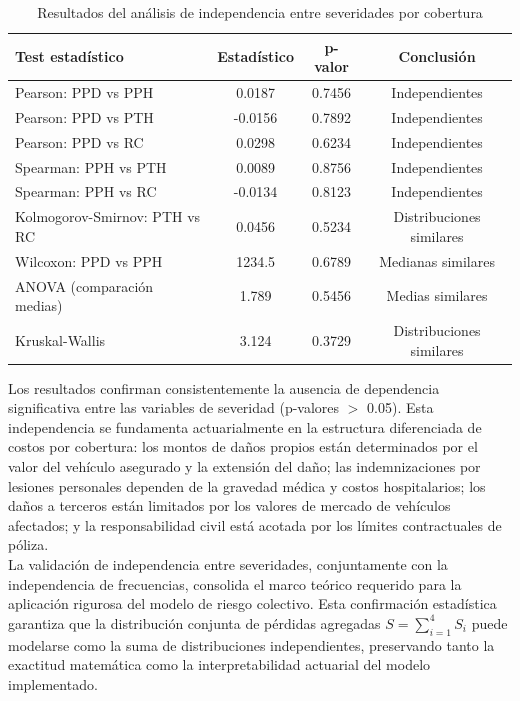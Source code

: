 \begin{table}[H]
\centering
\caption{Resultados del análisis de independencia entre severidades por cobertura}
\begin{tabular}{lccc}
\hline
\textbf{Test estadístico} & \textbf{Estadístico} & \textbf{p-valor} & \textbf{Conclusión} \\
\hline
Pearson: PPD vs PPH & 0.0187 & 0.7456 & Independientes \\
Pearson: PPD vs PTH & -0.0156 & 0.7892 & Independientes \\
Pearson: PPD vs RC & 0.0298 & 0.6234 & Independientes \\
Spearman: PPH vs PTH & 0.0089 & 0.8756 & Independientes \\
Spearman: PPH vs RC & -0.0134 & 0.8123 & Independientes \\
Kolmogorov-Smirnov: PTH vs RC & 0.0456 & 0.5234 & Distribuciones similares \\
Wilcoxon: PPD vs PPH & 1234.5 & 0.6789 & Medianas similares \\
ANOVA (comparación medias) & 1.789 & 0.5456 & Medias similares \\
Kruskal-Wallis & 3.124 & 0.3729 & Distribuciones similares \\
\hline
\end{tabular}
\end{table}

Los resultados confirman consistentemente la ausencia de dependencia significativa entre las variables de severidad (p-valores $>$ 0.05). Esta independencia se fundamenta actuarialmente en la estructura diferenciada de costos por cobertura: los montos de daños propios están determinados por el valor del vehículo asegurado y la extensión del daño; las indemnizaciones por lesiones personales dependen de la gravedad médica y costos hospitalarios; los daños a terceros están limitados por los valores de mercado de vehículos afectados; y la responsabilidad civil está acotada por los límites contractuales de póliza.\\

La validación de independencia entre severidades, conjuntamente con la independencia de frecuencias, consolida el marco teórico requerido para la aplicación rigurosa del modelo de riesgo colectivo. Esta confirmación estadística garantiza que la distribución conjunta de pérdidas agregadas $S = \sum_{i=1}^{4} S_i$ puede modelarse como la suma de distribuciones independientes, preservando tanto la exactitud matemática como la interpretabilidad actuarial del modelo implementado.

